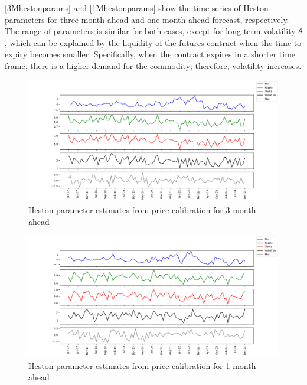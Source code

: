 \documentclass[12pt,a4paper]{article}
\newcommand\colorAutoref[1]{{\hypersetup{linkcolor=black}\autoref{#1}}}
\numberwithin{equation}{section}
\begin{document}
\colorAutoref{3Mhestonparams} and  \colorAutoref{1Mhestonparams} show the time series of Heston parameters for three month-ahead and one month-ahead forecast, respectively. The range of parameters is similar for both cases, except for long-term volatility $\theta$, which can be explained by the liquidity of the futures contract when the time to expiry becomes smaller. Specifically, when the contract expires in a shorter time frame, there is a higher demand for the commodity; therefore, volatility increases.


\begin{figure}[h!] 
\includegraphics[scale=1,width=1\linewidth,height=0.3\textheight]{heston_params_3m.png}
\caption{Heston parameter estimates from price calibration for 3 month-ahead}
\label{3Mhestonparams}
\end{figure}

\begin{figure}[h!] 
\includegraphics[scale=1,width=1\linewidth,height=0.3\textheight]{heston_params_1m.png}
\caption{Heston parameter estimates from price calibration for 1 month-ahead}
\label{1Mhestonparams}
\end{figure}
\end{document}
